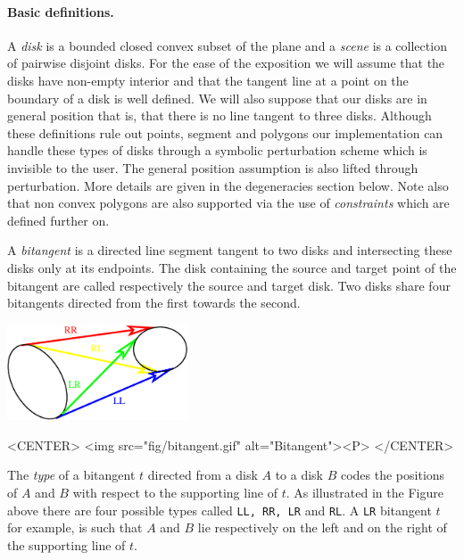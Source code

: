 \paragraph{Basic definitions. }
A \emph{disk} is a bounded closed convex subset of the plane and a \emph{scene}
is a collection of pairwise disjoint disks. For the ease of the exposition we
will assume that the disks have non-empty interior and that the tangent line at
a point on the boundary of a disk is well defined. We will also suppose that our
disks are in general position that is, that there is no line tangent to three
disks. Although these definitions rule out points, segment and polygons our
implementation can handle these types of disks through a symbolic perturbation
scheme which is invisible to the user.  The general position assumption is also
lifted through perturbation.  More details are given in the degeneracies section
below. Note also that non convex polygons are also supported via the use of
\emph{constraints} which are defined further on.

A \emph{bitangent} is a directed line segment tangent to two disks and
intersecting these disks only at its endpoints.  The disk containing the source
and target point of the bitangent are called respectively the source and target
disk.  Two disks share four bitangents directed from the first towards the
second. 

\begin{ccTexOnly}
    \begin{center}
      \parbox{0.4\textwidth}{%
          \includegraphics[width=0.4\textwidth]{fig/bitangent.eps}%
      }
    \end{center}
\end{ccTexOnly}

\begin{ccHtmlOnly}
    <CENTER>
        <img src="fig/bitangent.gif" alt="Bitangent"><P>
    </CENTER>
\end{ccHtmlOnly}

The \emph{type} of a bitangent $t$ directed from a disk $A$ to a disk $B$ codes
the positions of $A$ and $B$ with respect to the supporting line of $t$. As
illustrated in the Figure above there are four possible types called \texttt{LL,
RR, LR} and \texttt{RL}. A \texttt{LR} bitangent $t$ for example, is such that
$A$ and $B$ lie respectively on the left and on the right of the supporting line
of $t$. 

